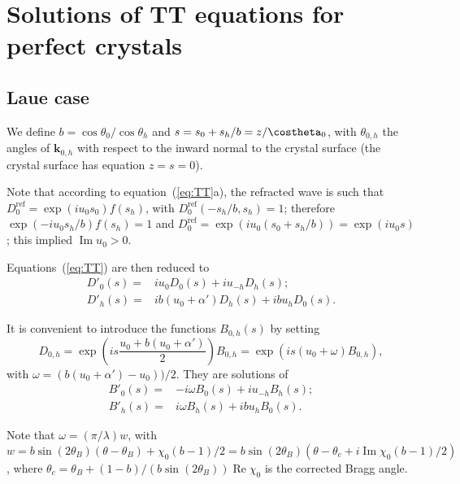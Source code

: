 \documentclass[preprint]{iucr}              %
\begin{document}
%
\section{Solutions of TT equations for perfect crystals}
\label{sec:TTsolutions}

\subsection{Laue case}
\label{sec:TTsolutionsLaue}We define $b=\cos\theta_0/\cos\theta_h$ and $s=s_0+s_h/b=z/\costheta_0$, with $\theta_{0,h}$ the angles of $\textbf{k}_{0,h}$ with respect to the inward normal to the crystal surface (the crystal surface has equation $z=s=0$). 

Note that according to equation~(\ref{eq:TT}a), the refracted wave is such that $D_0^{\text{ref}}=\exp(i u_0 s_0) f(s_h)$, with $D_0^{\text{ref}}(-s_h/b,s_h)=1$; therefore $\exp(-i u_0 s_h / b) f(s_h) = 1$ and $ D_0^{\text{ref}}=\exp(i u_0(s_0+s_h/b))=\exp(i u_0 s)$; this implied $\operatorname{Im} u_0 > 0$. 

Equations~(\ref{eq:TT}) are then reduced to
\begin{subequations}
\label{eq:TTlaue}
\begin{align}
D'_0(s) =& i u_0 D_0(s) + i u_{-h} D_h(s); \\
D'_h(s) =& i b (u_0 + \alpha') D_h(s) + i b u_{h} D_0(s).
\end{align}
\end{subequations}

It is convenient to introduce the functions $B_{0,h}(s)$ by setting
\begin{equation}
\label{eq:TTlaueB}
D_{0,h} = \exp \left( i s \frac{u_0 + b (u_0+\alpha')}{2} \right) B_{0,h} = \exp(i s (u_0+\omega) B_{0,h}),  
\end{equation}
with $\omega=(b(u_0+\alpha')-u_0))/2$. They are solutions of 
\begin{subequations}
\label{eq:TTlaueB}
\begin{align}
B'_0(s) =& -i \omega B_0(s) + i u_{-h} B_h(s); \\
B'_h(s) =& i \omega B_h(s) + i b u_{h} B_0(s).
\end{align}
\end{subequations}

Note that $\omega=(\pi/\lambda) w$, with $w=b \sin(2\theta_B)(\theta-\theta_B)+\chi_0 (b-1)/2=b \sin(2\theta_B)(\theta-\theta_c+ i \operatorname{Im} \chi_0 (b-1)/2)$, where $\theta_c=\theta_B+ (1-b)/(b \sin(2\theta_B)) \operatorname{Re}\chi_0$ is the corrected Bragg angle.
\end{document}
